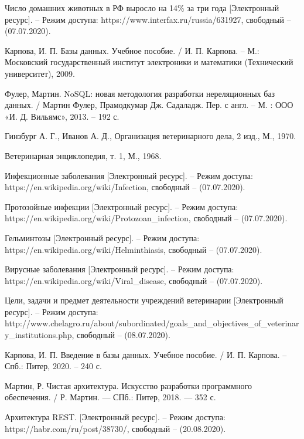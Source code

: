\documentclass[a4paper,14pt]{article}
\begin{document}
\newpage
\begin{thebibliography}{3}

Число домашних животных в РФ выросло на 14\% за три года [Электронный ресурс]. -- Режим доступа: https://www.interfax.ru/russia/631927, свободный -- (07.07.2020).

Карпова, И. П. Базы данных. Учебное пособие. / И. П. Карпова. – М.: Московский государственный институт электроники и математики (Технический университет), 2009.

Фулер, Мартин. NoSQL: новая методология разработки нереляционных баз данных. / Мартин Фулер, Прамодкумар Дж. Садаладж. Пер. с англ. – М. : ООО «И. Д. Вильямс», 2013. – 192 с.

Гинзбург А. Г., Иванов А. Д., Организация ветеринарного дела, 2 изд., М., 1970.

Ветеринарная энциклопедия, т. 1, М., 1968.

Инфекционные заболевания [Электронный ресурс]. -- Режим доступа: https://en.wikipedia.org/wiki/Infection, свободный -- (07.07.2020).

Протозойные инфекции [Электронный ресурс]. -- Режим доступа: https://en.wikipedia.org/wiki/Protozoan\_infection, свободный -- (07.07.2020).

Гельминтозы [Электронный ресурс]. -- Режим доступа: https://en.wikipedia.org/wiki/Helminthiasis, свободный -- (07.07.2020).

Вирусные заболевания [Электронный ресурс]. -- Режим доступа: https://en.wikipedia.org/wiki/Viral\_disease, свободный -- (07.07.2020).

Цели, задачи и предмет деятельности учреждений ветеринарии [Электронный ресурс]. -- Режим доступа: http://www.chelagro.ru/about/subordinated/goals\_and\_objectives\_of\_veterinary\_institutions.php, свободный -- (08.07.2020).

Карпова, И. П. Введение в базы данных. Учебное пособие. / И. П. Карпова. – Спб.: Питер, 2020. – 240 с.

Мартин, Р. Чистая архитектура. Искусство разработки программного обеспечения. / Р. Мартин. — СПб.: Питер, 2018. — 352 с.

Архитектура REST. [Электронный ресурс]. -- Режим доступа: https://habr.com/ru/post/38730/, свободный -- (20.08.2020).

\end{thebibliography}
\end{document}
